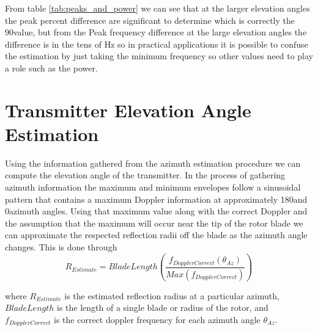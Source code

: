 From table \ref{tab:peaks_and_power} we can see that at the larger elevation angles the peak percent difference are significant to determine which is correctly the 90\textdegree value, but from the Peak frequency difference at the large elevation angles the difference is in the tens of Hz so in practical applications it is possible to confuse the estimation by just taking the minimum frequency so other values need to play a role such as the power.


\section{Transmitter Elevation Angle Estimation}
Using the information gathered from the azimuth estimation procedure we can compute the elevation angle of the transmitter. In the process of gathering azimuth information the maximum and minimum envelopes follow a sinusoidal pattern that contains a maximum Doppler information at approximately 180\textdegree \space and 0\textdegree \space azimuth angles. Using that maximum value along with the correct Doppler and the assumption that the maximum will occur near the tip of the rotor blade we can approximate the respected reflection radii off the blade as the azimuth angle changes. This is done through 
\begin{equation}
	R_{Estimate} = BladeLength \left(\frac{f_{DopplerCorrect}(\theta_{Az})}{Max(f_{DopplerCorrect})}\right)
	\label{eqn:r_estimate}
\end{equation}

where $R_{Estimate}$ is the estimated reflection radius at a particular azimuth, $BladeLength$ is the length of a single blade or radius of the rotor, and $f_{DopplerCorrect}$ is the correct doppler frequency for each azimuth angle $\theta_{Az}$.


